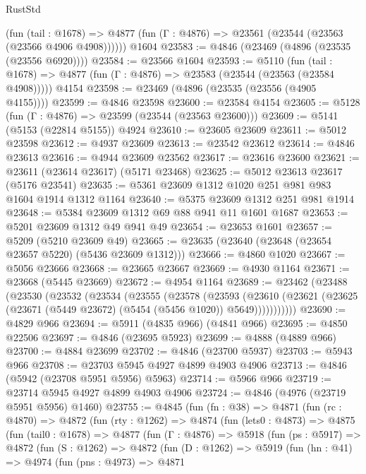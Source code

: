\begin{lexlean}{RustStd}
\begin{coremodule}
      (fun (tail : @1678) =>
      @4877 (fun (Γ : @4876) => @23561 (@23544 (@23563 (@23566 @4906 @4908))))))
    @1604
@23583 := @4846 (@23469 (@4896 (@23535 (@23556 @6920))))
@23584 := @23566 @1604
@23593 := @5110
    (fun (tail : @1678) => @4877 (fun (Γ : @4876) => @23583 (@23544 (@23563 (@23584 @4908)))))
    @4154
@23598 := @23469 (@4896 (@23535 (@23556 (@4905 @4155))))
@23599 := @4846 @23598
@23600 := @23584 @4154
@23605 := @5128 (fun (Γ : @4876) => @23599 (@23544 (@23563 @23600)))
@23609 := @5141 (@5153 (@22814 @5155)) @4924
@23610 := @23605 @23609
@23611 := @5012 @23598
@23612 := @4937 @23609
@23613 := @23542 @23612
@23614 := @4846 @23613
@23616 := @4944 @23609 @23562
@23617 := @23616 @23600
@23621 := @23611 (@23614 @23617) (@5171 @23468)
@23625 := @5012 @23613 @23617 (@5176 @23541)
@23635 := @5361 @23609 @1312 @1020 @251 @981 @983 @1604 @1914 @1312 @1164
@23640 := @5375 @23609 @1312 @251 @981 @1914
@23648 := @5384 @23609 @1312 @69 @88 @941 @11 @1601 @1687
@23653 := @5201 @23609 @1312 @49 @941 @49
@23654 := @23653 @1601
@23657 := @5209 (@5210 @23609 @49)
@23665 := @23635 (@23640 (@23648 (@23654 @23657 @5220) (@5436 @23609 @1312)))
@23666 := @4860 @1020
@23667 := @5056 @23666
@23668 := @23665 @23667
@23669 := @4930 @1164
@23671 := @23668 (@5445 @23669)
@23672 := @4954 @1164
@23689 := @23462
    (@23488
      (@23530
        (@23532
          (@23534
            (@23555
              (@23578
                (@23593
                  (@23610
                    (@23621 (@23625 (@23671 (@5449 @23672) (@5454 (@5456 @1020)) @5649)))))))))))
@23690 := @4829 @966
@23694 := @5911 (@4835 @966) (@4841 @966)
@23695 := @4850 @22506
@23697 := @4846 (@23695 @5923)
@23699 := @4888 (@4889 @966)
@23700 := @4884 @23699
@23702 := @4846 (@23700 @5937)
@23703 := @5943 @966
@23708 := @23703 @5945 @4927 @4899 @4903 @4906
@23713 := @4846 (@5942 (@23708 @5951 @5956) @5963)
@23714 := @5966 @966
@23719 := @23714 @5945 @4927 @4899 @4903 @4906
@23724 := @4846 (@4976 (@23719 @5951 @5956) @1460)
@23755 := @4845
    (fun (fn : @38) =>
    @4871
      (fun (rc : @4870) =>
      @4872
        (fun (rty : @1262) =>
        @4874
          (fun (lets0 : @4873) =>
          @4875
            (fun (tail0 : @1678) =>
            @4877
              (fun (Γ : @4876) =>
              @5918
                (fun (ps : @5917) =>
                @4872
                  (fun (S : @1262) =>
                  @4872
                    (fun (D : @1262) =>
                    @5919
                      (fun (hn : @41) =>
                      @4974
                        (fun (pns : @4973) =>
                        @4871

\end{coremodule}
\end{lexlean}

